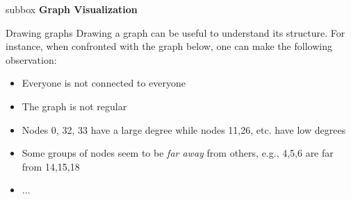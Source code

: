\documentclass[a4paper,11pt]{book}
\begin{document}

\newpage



\begin{subbox}{subbox}{}
\centering
\Large{\textbf{Graph Visualization}}
\end{subbox}



\begin{textbox}{Drawing graphs}
Drawing a graph can be useful to understand its structure. For instance, when confronted with the graph below, one can make the following observation:
\begin{itemize}
    \item Everyone is not connected to everyone
    \item The graph is not regular
    \item Nodes 0, 32, 33 have a large degree while nodes 11,26, etc. have low degrees
    \item Some groups of nodes seem to be \textit{far away} from others, e.g., 4,5,6 are far from 14,15,18
    \item ...
\end{itemize}


\end{textbox}




\end{document}
